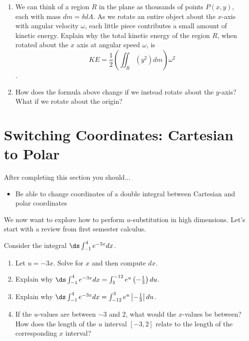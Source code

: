 {\begin{problem}
\begin{enumerate}
  \item We can think of a region $R$ in the plane as thousands of points $P(x,y)$, each with mass $dm=\delta dA$. As we rotate an entire object about the $x$-axis with angular velocity $\omega$, each little piece contributes a small amount of kinetic energy. Explain why the total kinetic energy of the region $R$, when rotated about the $x$ axis at angular speed $\omega$, is
$$KE= \frac{1}{2}\left(\iint_R (y^2)dm\right)\omega^2$$.  
  \item How does the formula above change if we instead rotate about the $y$-axis? What if we rotate about the origin?
 \end{enumerate}
\end{problem}

} %

%
\section{Switching Coordinates: Cartesian to Polar}
After completing this section you should... 
\begin{itemize}
\item Be able to change coordinates of a double integral between Cartesian and polar coordinates
\end{itemize}

\vskip0.1cm

We now want to explore how to perform $u$-substitution in high dimensions. Let's start with a review from first semester calculus.

\begin{review*}
Consider the integral $\ds\int_{-1}^4 e^{-3x} dx$.  
\begin{enumerate}
 \item Let $u=-3x$.  Solve for $x$ and then compute $dx$.
 \item Explain why $\ds\int_{-1}^4 e^{-3x} dx=\int_{3}^{-12}e^u \left(-\frac{1}{3}\right)du$.  
 \item Explain why $\ds\int_{-1}^4 e^{-3x} dx=\int_{-12}^{3}e^u \left|-\frac{1}{3}\right| du$.
 \item If the $u$-values are between $-3$ and $2$, what would the $x$-values be between? How does the  length of the $u$ interval $[-3,2]$ relate to the length of the corresponding $x$ interval?
\end{enumerate}
\end{review*}

